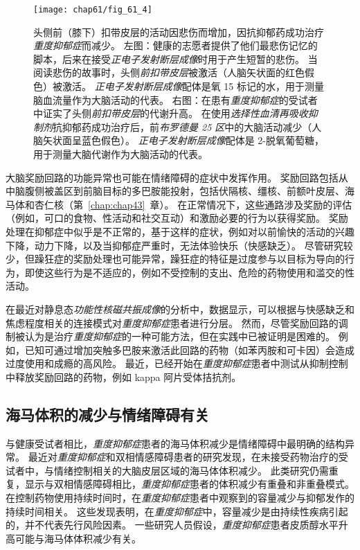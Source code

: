 \begin{figure}[htbp]
	\centering
	\texttt{[image: chap61/fig\_61\_4]}
	\caption{头侧前（膝下）扣带皮层的活动因悲伤而增加，因抗抑郁药成功治疗\textit{重度抑郁症}而减少\cite{mayberg1997cingulate}。
		 左图：健康的志愿者提供了他们最悲伤记忆的脚本，后来在接受\textit{正电子发射断层成像}时用于产生短暂的悲伤。
		 当阅读悲伤的故事时，头侧\textit{前扣带皮层}被激活（人脑矢状面的红色假色）被激活。
		 \textit{正电子发射断层成像}配体是氧 15 标记的水，用于测量脑血流量作为大脑活动的代表。
		 右图：在患有\textit{重度抑郁症}的受试者中证实了头侧\textit{前扣带皮层}的代谢升高。
		 在使用\textit{选择性血清再吸收抑制剂}抗抑郁药成功治疗后，前\textit{布罗德曼 25 区}中的大脑活动减少（人脑矢状面呈蓝色假色）。
		 \textit{正电子发射断层成像}配体是 2-脱氧葡萄糖，用于测量大脑代谢作为大脑活动的代表。}
	\label{fig:61_4}
\end{figure}


大脑奖励回路的功能异常也可能在情绪障碍的症状中发挥作用。
奖励回路包括从中脑腹侧被盖区到前脑目标的多巴胺能投射，包括伏隔核、缰核、前额叶皮层、海马体和杏仁核（第~\ref{chap:chap43}~章）。
在正常情况下，这些通路涉及奖励的评估（例如，可口的食物、性活动和社交互动）和激励必要的行为以获得奖励。
奖励处理在抑郁症中似乎是不正常的，基于这样的症状，例如对以前愉快的活动的兴趣下降，动力下降，以及当抑郁症严重时，无法体验快乐（快感缺乏）。
尽管研究较少，但躁狂症的奖励处理也可能异常，躁狂症的特征是过度参与以目标为导向的行为，即使这些行为是不适应的，例如不受控制的支出、危险的药物使用和滥交的性活动。


在最近对静息态\textit{功能性核磁共振成像}的分析中，数据显示，可以根据与快感缺乏和焦虑程度相关的连接模式对\textit{重度抑郁症}患者进行分层。
然而，尽管奖励回路的调制被认为是治疗\textit{重度抑郁症}的一种可能方法，但在实践中已被证明是困难的。
例如，已知可通过增加突触多巴胺来激活此回路的药物（如苯丙胺和可卡因）会造成过度使用和成瘾的高风险。
最近，已经开始在\textit{重度抑郁症}患者中测试从抑制控制中释放奖励回路的药物，例如 kappa 阿片受体拮抗剂。



\subsection{海马体积的减少与情绪障碍有关}

与健康受试者相比，\textit{重度抑郁症}患者的海马体积减少是情绪障碍中最明确的结构异常。
最近对\textit{重度抑郁症}和双相情感障碍患者的研究发现，在未接受药物治疗的受试者中，与情绪控制相关的大脑皮层区域的海马体体积减少。
此类研究仍需重复，显示与双相情感障碍相比，\textit{重度抑郁症}患者的体积减少有重叠和非重叠模式。
在控制药物使用持续时间时，在\textit{重度抑郁症}患者中观察到的容量减少与抑郁发作的持续时间相关。
这些发现表明，在\textit{重度抑郁症}中，容量减少是由持续性疾病引起的，并不代表先行风险因素。
一些研究人员假设，\textit{重度抑郁症}患者皮质醇水平升高可能与海马体体积减少有关。


